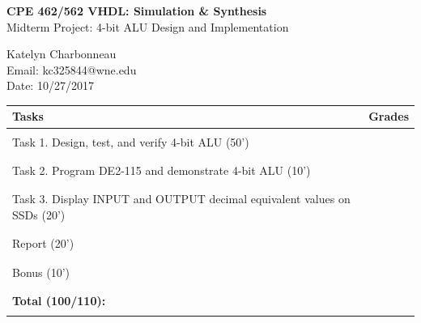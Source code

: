 \documentclass[12pt]{article}
\begin{document}
\begin{figure}[htb]
\hfil \hspace{.5in}
\end{figure}

\begin{center}
{\Large {\bf CPE 462/562 VHDL: Simulation \& Synthesis}}\\
\vspace{0.2in}
{\Large{Midterm Project: 4-bit ALU Design and Implementation}} \\
\vspace{0.2in}

Katelyn Charbonneau\\
Email: kc325844@wne.edu\\
Date: 10/27/2017\\
\end{center}

\begin{table}[!h]
\centering
\begin{tabular}{| >{\arraybackslash}m{4in} | >{\centering\arraybackslash}m{1in} | }
  \hline
  \textbf{Tasks} & \textbf{Grades} \\
  \hline
  &\\
  Task 1. Design, test, and verify 4-bit ALU (50') & \\
  &\\
  \hline
  &\\
  Task 2. Program DE2-115 and demonstrate 4-bit ALU (10') & \\
  &\\
  \hline
  &\\
  Task 3. Display INPUT and OUTPUT decimal equivalent values on SSDs (20') & \\
  &\\
  \hline
  &\\
  Report (20') & \\
  &\\
  \hline
    &\\
  Bonus (10') & \\
  &\\
  \hline
  \hline
    &\\
  \textbf{Total (100/110):} & \\
  &\\
  \hline

\end{tabular}
\end{table}
\end{document}
